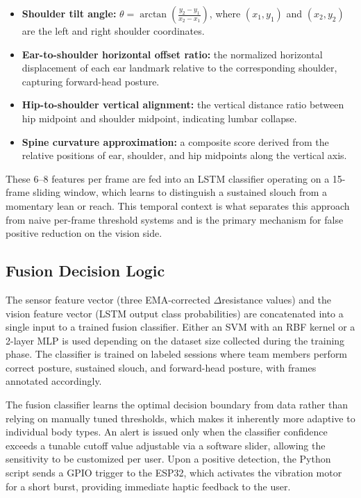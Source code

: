 \documentclass[conference]{IEEEtran}
\begin{document}
\begin{itemize}
    \item \textbf{Shoulder tilt angle:} 
    $\theta = \arctan\!\left(\frac{y_2 - y_1}{x_2 - x_1}\right)$, 
    where $(x_1,y_1)$ and $(x_2,y_2)$ are the left and 
    right shoulder coordinates.
    
    \item \textbf{Ear-to-shoulder horizontal offset ratio:} 
    the normalized horizontal displacement of each ear 
    landmark relative to the corresponding shoulder, 
    capturing forward-head posture.
    
    \item \textbf{Hip-to-shoulder vertical alignment:} 
    the vertical distance ratio between hip midpoint and 
    shoulder midpoint, indicating lumbar collapse.
    
    \item \textbf{Spine curvature approximation:} a 
    composite score derived from the relative positions 
    of ear, shoulder, and hip midpoints along the 
    vertical axis.
\end{itemize}

These 6--8 features per frame are fed into an LSTM 
classifier operating on a 15-frame sliding window, 
which learns to distinguish a sustained slouch from 
a momentary lean or reach. This temporal context is 
what separates this approach from naive per-frame 
threshold systems and is the primary mechanism for 
false positive reduction on the vision side.

\subsection{Fusion Decision Logic}

The sensor feature vector (three EMA-corrected 
$\Delta$resistance values) and the vision feature vector 
(LSTM output class probabilities) are concatenated into 
a single input to a trained fusion classifier. Either 
an SVM with an RBF kernel or a 2-layer MLP is used 
depending on the dataset size collected during the 
training phase. The classifier is trained on labeled 
sessions where team members perform correct posture, 
sustained slouch, and forward-head posture, with frames 
annotated accordingly.

The fusion classifier learns the optimal decision 
boundary from data rather than relying on manually 
tuned thresholds, which makes it inherently more 
adaptive to individual body types. An alert is issued 
only when the classifier confidence exceeds a tunable 
cutoff value adjustable via a software slider, allowing 
the sensitivity to be customized per user. Upon a 
positive detection, the Python script sends a GPIO 
trigger to the ESP32, which activates the vibration 
motor for a short burst, providing immediate haptic 
feedback to the user.
\end{document}

